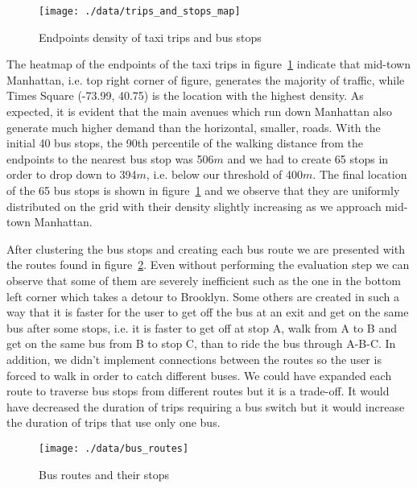 \documentclass{article}
\begin{document}
\begin{figure}[t]
	\vskip 5mm
	\begin{center}
		\centerline{\texttt{[image: ./data/trips\_and\_stops\_map]}}
		\caption{Endpoints density of taxi trips and bus stops}
		\label{fig:clusters}
	\end{center}
	\vskip -5mm
\end{figure}

The heatmap of the endpoints of the taxi trips in figure~\ref{fig:clusters} indicate that mid-town Manhattan, i.e. top right corner of figure, generates the majority of traffic, while Times Square (-73.99, 40.75) is the location with the highest density. As expected, it is evident that the main avenues which run down Manhattan also generate much higher demand than the horizontal, smaller, roads. With the initial 40 bus stops, the 90th percentile of the walking distance from the endpoints to the nearest bus stop was 506$m$ and we had to create 65 stops in order to drop down to 394$m$, i.e. below our threshold of 400$m$. The final location of the 65 bus stops is shown in figure~\ref{fig:clusters} and we observe that they are uniformly distributed on the grid with their density slightly increasing as we approach mid-town Manhattan.

After clustering the bus stops and creating each bus route we are presented with the routes found in figure~\ref{fig:bus_routes}. Even without performing the evaluation step we can observe that some of them are severely inefficient such as the one in the bottom left corner which takes a detour to Brooklyn. Some others are created in such a way that it is faster for the user to get off the bus at an exit and get on the same bus after some stops, i.e. it is faster to get off at stop A, walk from A to B and get on the same bus from B to stop C, than to ride the bus through A-B-C. In addition, we didn't implement connections between the routes so the user is forced to walk in order to catch different buses. We could have expanded each route to traverse bus stops from different routes but it is a trade-off. It would have decreased the duration of trips requiring a bus switch but it would increase the duration of trips that use only one bus.

\begin{figure}[tph]
	\vskip 5mm
	\begin{center}
		\centerline{\texttt{[image: ./data/bus\_routes]}}
		\caption{Bus routes and their stops}
		\label{fig:bus_routes}
	\end{center}
	\vskip -5mm
\end{figure}
\end{document}
